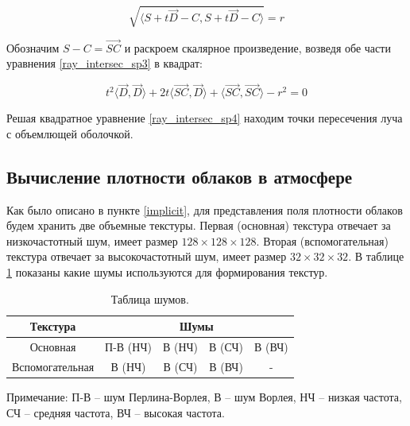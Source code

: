 \begin{equation}
	\label{ray_intersec_sp3}
	\sqrt{\langle S + t \vec{D} - C , S + t \vec{D} - C \rangle} = r
\end{equation}

Обозначим $ S - C = \vec{SC} $ и раскроем скалярное произведение, возведя обе части уравнения \eqref{ray_intersec_sp3} в квадрат:

\begin{equation}
	\label{ray_intersec_sp4}
	t ^ 2 \langle \vec{D}, \vec{D} \rangle + 2t \langle \vec{SC}, \vec{D} \rangle + \langle \vec{SC}, \vec{SC} \rangle - r ^ 2 = 0
\end{equation}

Решая квадратное уравнение \eqref{ray_intersec_sp4} находим точки пересечения луча с объемлющей оболочкой.

\subsection{Вычисление плотности облаков в атмосфере}

Как было описано в пункте \ref{implicit}, для представления поля плотности облаков будем хранить две объемные текстуры.
Первая (основная) текстура отвечает за низкочастотный шум, имеет размер $ 128 \times 128 \times 128 $. Вторая (вспомогательная) текстура отвечает за высокочастотный шум, имеет размер $ 32 \times 32 \times 32 $. 
В таблице \ref{tab:textures} показаны какие шумы используются для формирования текстур.


\begin{table}[h]
	\centering
	\begin{threeparttable}
		\captionsetup{justification=raggedleft,singlelinecheck=false}
		\caption{Таблица шумов.}      
		\begin{tabular}{|c|c|c|c|c|}
			\hline
			Текстура & \multicolumn{4}{c|}{Шумы} \\
			\hline
			Основная & П-В (НЧ) & В (НЧ) & В (СЧ) & В (ВЧ)\\
			\hline
			Вспомогательная & В (НЧ) & В (СЧ) & В (ВЧ) & -\\
			\hline
		\end{tabular}
		\begin{tablenotes}
			\small
			\item Примечание: П-В -- шум Перлина-Ворлея, В -- шум Ворлея, НЧ -- низкая частота, СЧ -- средняя частота, ВЧ -- высокая частота.
		\end{tablenotes}
	\end{threeparttable} 
	 
\label{tab:textures}
\end{table}



